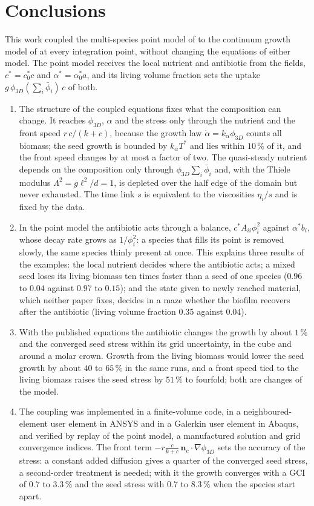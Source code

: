 \documentclass[11pt,a4paper]{article}
\newcommand{\phiD}{\phi_{3D}}
\newcommand{\lv}{\textstyle\sum_i\bar\phi_i}
\newcommand{\nc}{\mathbf n_c}
\newcommand{\fterm}{\ensuremath{-r\tfrac{c}{k+c}\,\nc\cdot\nabla\phiD}}
\begin{document}
\section{Conclusions}
\label{sec:conclusions}

This work coupled the multi-species point model of \citet{Klempt2026ContinuumBacterialGrowth} to the continuum growth model of \citet{Klempt2024DiffusionDrivenGrowth} at every integration point, without changing the equations of either model. The point model receives the local nutrient and antibiotic from the fields, $c^*=c^*_0c$ and $\alpha^*=\alpha^*_0a$, and its living volume fraction sets the uptake $g\,\phiD(\lv)\,c$ of both.
\begin{enumerate}
\item The structure of the coupled equations fixes what the composition can change. It reaches $\phiD$, $\alpha$ and the stress only through the nutrient and the front speed $r\,c/(k+c)$, because the growth law $\dot\alpha=k_\alpha\phiD$ counts all biomass; the seed growth is bounded by $k_\alpha T^*$ and lies within $10\,\%$ of it, and the front speed changes by at most a factor of two. The quasi-steady nutrient depends on the composition only through $\phiD\lv$ and, with the Thiele modulus $\Lambda^2=g\ell^2/d=1$, is depleted over the half edge of the domain but never exhausted. The time link $s$ is equivalent to the viscosities $\eta_i/s$ and is fixed by the data.
\item In the point model the antibiotic acts through a balance, $c^*A_{ii}\phi_i^2$ against $\alpha^*b_i$, whose decay rate grows as $1/\phi_i^2$: a species that fills its point is removed slowly, the same species thinly present at once. This explains three results of the examples: the local nutrient decides where the antibiotic acts; a mixed seed loses its living biomass ten times faster than a seed of one species ($0.96$ to $0.04$ against $0.97$ to $0.15$); and the state given to newly reached material, which neither paper fixes, decides in a maze whether the biofilm recovers after the antibiotic (living volume fraction $0.35$ against $0.04$).
\item With the published equations the antibiotic changes the growth by about $1\,\%$ and the converged seed stress within its grid uncertainty, in the cube and around a molar crown. Growth from the living biomass would lower the seed growth by about $40$ to $65\,\%$ in the same runs, and a front speed tied to the living biomass raises the seed stress by $51\,\%$ to fourfold; both are changes of the model.
\item The coupling was implemented in a finite-volume code, in a neighboured-element user element in ANSYS and in a Galerkin user element in Abaqus, and verified by replay of the point model, a manufactured solution and grid convergence indices. The front term \fterm{} sets the accuracy of the stress: a constant added diffusion gives a quarter of the converged seed stress, a second-order treatment is needed; with it the growth converges with a GCI of $0.7$ to $3.3\,\%$ and the seed stress with $0.7$ to $8.3\,\%$ when the species start apart.
\end{enumerate}
\end{document}
